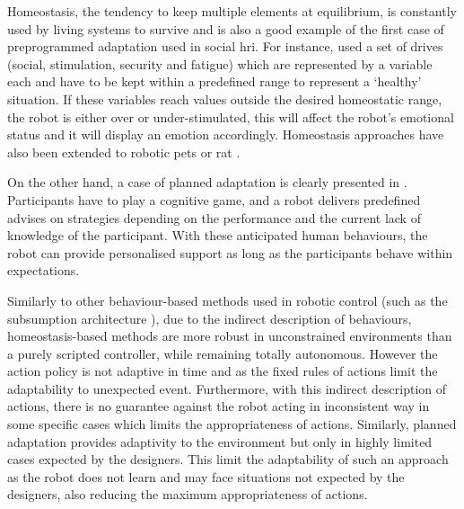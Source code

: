 	
	Homeostasis, the tendency to keep multiple elements at equilibrium, is constantly used by living systems to survive and is also a good example of the first case of preprogrammed adaptation used in social \gls{hri}. For instance, \citet{breazeal1998motivational} used a set of drives (social, stimulation, security and fatigue) which are represented by a variable each and have to be kept within a predefined range to represent a `healthy' situation. If these variables reach values outside the desired homeostatic range, the robot is either over or under-stimulated, this will affect the robot's emotional status and it will display an emotion accordingly. Homeostasis approaches have also been extended to robotic pets \citep{arkin2003ethological} or \gls{rat} \citep{cao2017collaborative}.
	
	On the other hand, a case of planned adaptation is clearly presented in \citet{leyzberg2014personalizing}. Participants have to play a cognitive game,  and a robot delivers predefined advises on strategies depending on the performance and the current lack of knowledge of the participant. With these anticipated human behaviours, the robot can provide personalised support as long as the participants behave within expectations. 

	
	Similarly to other behaviour-based methods used in robotic control (such as the subsumption architecture \citealt{brooks1986robust}), due to the indirect description of behaviours, homeostasis-based methods are more robust in unconstrained environments than a purely scripted controller, while remaining totally autonomous. However the action policy is not adaptive in time and as the fixed rules of actions limit the adaptability to unexpected event. Furthermore, with this indirect description of actions, there is no guarantee against the robot acting in inconsistent way in some specific cases which limits the appropriateness of actions. Similarly, planned adaptation provides adaptivity to the environment but only in highly limited cases expected by the designers. This limit the adaptability of such an approach as the robot does not learn and may face situations not expected by the designers, also reducing the maximum appropriateness of actions.

